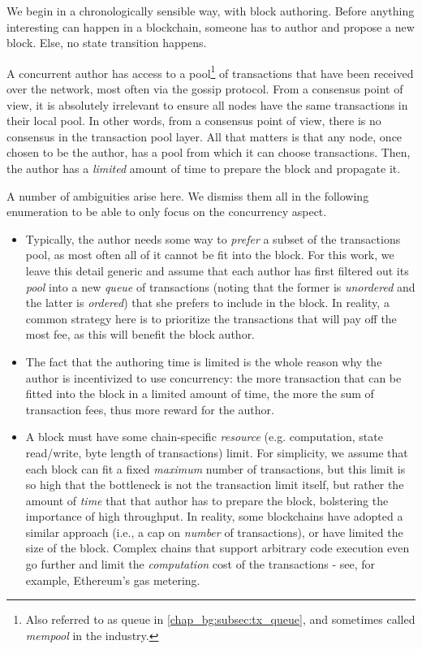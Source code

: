 We begin in a chronologically sensible way, with block authoring. Before anything interesting can
happen in a blockchain, someone has to author and propose a new block. Else, no state transition
happens.

A concurrent author has access to a pool\footnote{Also referred to as queue in
\ref{chap_bg:subsec:tx_queue}, and sometimes called \textit{mempool} in the industry.} of
transactions that have been received over the network, most often via the gossip protocol. From a
consensus point of view, it is absolutely irrelevant to ensure all nodes have the same transactions
in their local pool. In other words, from a consensus point of view, there is no consensus in the
transaction pool layer. All that matters is that any node, once chosen to be the author, has a pool
from which it can choose transactions. Then, the author has a \textit{limited} amount of time to
prepare the block and propagate it.

A number of ambiguities arise here. We dismiss them all in the following enumeration to be able to
only focus on the concurrency aspect.

\begin{itemize}
    \item Typically, the author needs some way to \textit{prefer} a subset of the transactions pool,
    as most often all of it cannot be fit into the block. For this work, we leave this detail
    generic and assume that each author has first filtered out its \textit{pool} into a new
    \textit{queue} of transactions (noting that the former is \textit{unordered} and the latter is
    \textit{ordered}) that she prefers to include in the block. In reality, a common strategy here
    is to prioritize the transactions that will pay off the most fee, as this will benefit the block
    author.
    \item The fact that the authoring time is limited is the whole reason why the author is
    incentivized to use concurrency: the more transaction that can be fitted into the block in a
    limited amount of time, the more the sum of transaction fees, thus more reward for the author.
    \item A block must have some chain-specific \textit{resource} (e.g. computation, state
    read/write, byte length of transactions) limit. For simplicity, we assume that each block can
    fit a fixed \textit{maximum} number of transactions, but this limit is so high that the
    bottleneck is not the transaction limit itself, but rather the amount of \textit{time} that that
    author has to prepare the block, bolstering the importance of high throughput. In reality, some
    blockchains have adopted a similar approach (i.e., a cap on \textit{number} of transactions), or
    have limited the size of the block. Complex chains that support arbitrary code execution even go
    further and limit the \textit{computation} cost of the transactions - see, for example,
    Ethereum's gas metering\cite{perezBrokenMetreAttacking2020}.
\end{itemize}

